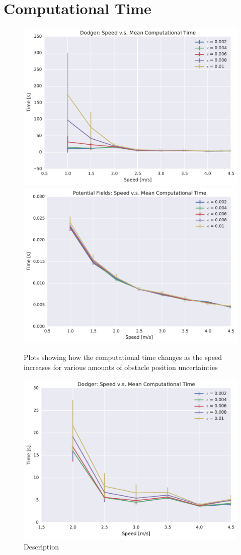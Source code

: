 \section{Computational Time}

\begin{figure}[h!]
    \centering
    \includegraphics[width=0.48\linewidth]{figs/planner_mean_times_0}
    \includegraphics[width=0.48\linewidth]{figs/pf_mean_times_0}
    \caption{Plots showing how the computational time changes as the speed
    increases for various amounts of obstacle position uncertainties}
    \label{fig:plot_comp_time}
\end{figure}

\begin{figure}[h!]
    \centering
    \includegraphics[width=0.7\linewidth]{figs/planner_small_mean_times_0}
    \caption{Description}
    \label{fig:plot_small_comp_time}
\end{figure}


